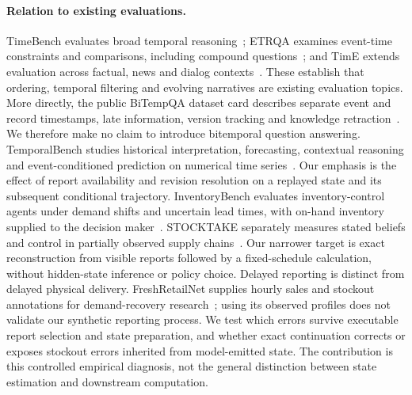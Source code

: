\paragraph{Relation to existing evaluations.}
TimeBench evaluates broad temporal reasoning~\citep{chu2024timebench}; ETRQA
examines event-time constraints and comparisons, including compound
questions~\citep{luo2025etrqa}; and TimE extends evaluation across factual,
news and dialog contexts~\citep{wei2025time}. These establish that ordering,
temporal filtering and evolving narratives are existing evaluation topics.
More directly, the public BiTempQA dataset card describes separate event and
record timestamps, late information, version tracking and knowledge
retraction~\citep{bitempqa}. We therefore make no claim to introduce bitemporal
question answering. TemporalBench studies historical interpretation, forecasting,
contextual reasoning and event-conditioned prediction on numerical time
series~\citep{weng2026temporalbench}. Our emphasis is the effect of report
availability and revision resolution on a replayed state and its subsequent
conditional trajectory. InventoryBench evaluates inventory-control agents under
demand shifts and uncertain lead times, with on-hand inventory supplied to the
decision maker~\citep{baek2026inventory}. STOCKTAKE separately measures stated
beliefs and control in partially observed supply chains~\citep{deb2026stocktake}.
Our narrower target is exact reconstruction from visible reports followed by a
fixed-schedule calculation, without hidden-state inference or policy choice.
Delayed reporting is distinct from delayed physical delivery. FreshRetailNet supplies hourly
sales and stockout annotations for demand-recovery research~\citep{wang2025freshretailnet};
using its observed profiles does not validate our synthetic reporting process.
We test which errors survive executable report selection and state preparation,
and whether exact continuation corrects or exposes stockout errors inherited from
model-emitted state. The contribution is this controlled empirical diagnosis,
not the general distinction between state estimation and downstream computation.
